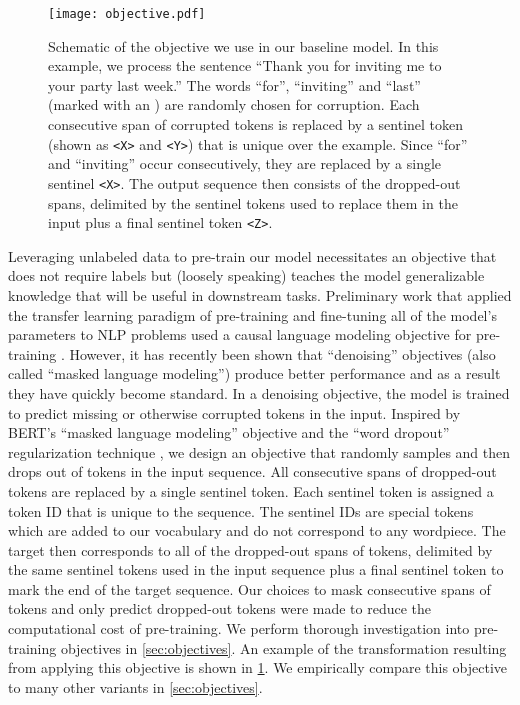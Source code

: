 \documentclass[twoside,11pt]{article}
\begin{document}
\begin{figure}[t]
    \centering
    \texttt{[image: objective.pdf]}
    \caption{Schematic of the objective we use in our baseline model.
    In this example, we process the sentence ``Thank you for inviting me to your party last week.''
    The words ``for'', ``inviting'' and ``last'' (marked with an ) are randomly chosen for corruption.
    Each consecutive span of corrupted tokens is replaced by a sentinel token (shown as \texttt{<X>} and \texttt{<Y>}) that is unique over the example.
    Since ``for'' and ``inviting'' occur consecutively, they are replaced by a single sentinel \texttt{<X>}.
    The output sequence then consists of the dropped-out spans, delimited by the sentinel tokens used to replace them in the input plus a final sentinel token \texttt{<Z>}.}
    \label{fig:objective}
\end{figure}

Leveraging unlabeled data to pre-train our model necessitates an objective that does not require labels but (loosely speaking) teaches the model generalizable knowledge that will be useful in downstream tasks.
Preliminary work that applied the transfer learning paradigm of pre-training and fine-tuning all of the model's parameters to NLP problems used a causal language modeling objective for pre-training \citep{dai2015semi,peters2018deep,radford2018improving,howard2018universal}.
However, it has recently been shown that ``denoising'' objectives \citep{devlin2018bert,taylor1953cloze} (also called ``masked language modeling'') produce better performance and as a result they have quickly become standard.
In a denoising objective, the model is trained to predict missing or otherwise corrupted tokens in the input.
Inspired by BERT's ``masked language modeling'' objective and the ``word dropout'' regularization technique \citep{bowman2015generating}, we design an objective that randomly samples and then drops out  of tokens in the input sequence.
All consecutive spans of dropped-out tokens are replaced by a single sentinel token.
Each sentinel token is assigned a token ID that is unique to the sequence.
The sentinel IDs are special tokens which are added to our vocabulary and do not correspond to any wordpiece.
The target then corresponds to all of the dropped-out spans of tokens, delimited by the same sentinel tokens used in the input sequence plus a final sentinel token to mark the end of the target sequence.
Our choices to mask consecutive spans of tokens and only predict dropped-out tokens were made to reduce the computational cost of pre-training.
We perform thorough investigation into pre-training objectives in \cref{sec:objectives}.
An example of the transformation resulting from applying this objective is shown in \cref{fig:objective}.
We empirically compare this objective to many other variants in \cref{sec:objectives}.
\end{document}
